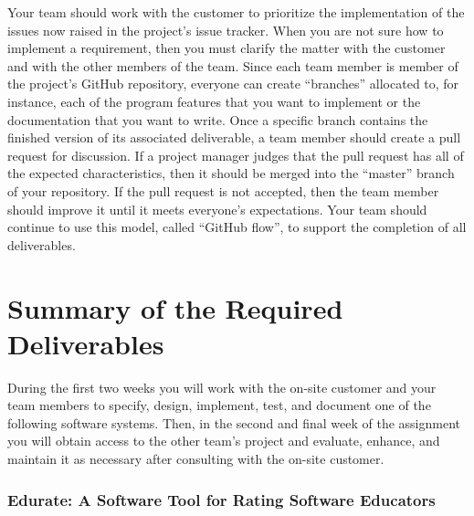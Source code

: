 \documentclass[11pt]{article}
\begin{document}

Your team should work with the customer to prioritize the implementation of the issues now raised in the project's issue
tracker. When you are not sure how to implement a requirement, then you must clarify the matter with the customer and
with the other members of the team. Since each team member is member of the project's GitHub repository, everyone can
create ``branches'' allocated to, for instance, each of the program features that you want to implement or the
documentation that you want to write. Once a specific branch contains the finished version of its associated
deliverable, a team member should create a pull request for discussion. If a project manager judges that the pull
request has all of the expected characteristics, then it should be merged into the ``master'' branch of your repository.
If the pull request is not accepted, then the team member should improve it until it meets everyone's expectations. Your
team should continue to use this model, called ``GitHub flow'', to support the completion of all deliverables.

\section*{Summary of the Required Deliverables}


During the first two weeks you will work with the on-site customer and your team members to specify, design, implement,
test, and document one of the following software systems. Then, in the second and final week of the assignment you will
obtain access to the other team's project and evaluate, enhance, and maintain it as necessary after consulting with the
on-site customer.

\vspace*{-.5em}

\subsubsection*{Edurate: A Software Tool for Rating Software Educators}
\end{document}
